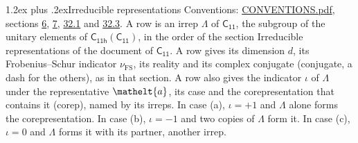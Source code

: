 \documentclass[10pt,a4paper]{article}
\makeatletter
\renewcommand\section{\@startsection{section}{1}{\z@}{-3ex plus -1ex minus -.2ex}%
  {1.2ex plus .2ex}{\normalfont\large\sffamily\bfseries\color{parttitle}}}
\numberwithin{equation}{section}
\newcommand{\eltfont}[1]{{\let\sigma\eltsigma\mathelt{#1}}}
\newcommand{\grp}[1]{\mathsf{#1}}
\newcommand{\elt}[1]{\eltfont{#1}}
\newcommand{\fsind}{\nu_{\mathrm{FS}}}
\makeatother
\begin{document}
\section{Irreducible representations}\label{s:irreps}
Conventions: \href{../../CONVENTIONS.pdf}{CONVENTIONS.pdf}, sections \href{../../../rotation/CONVENTIONS.pdf\#conv.6}{6}, \href{../../../rotation/CONVENTIONS.pdf\#conv.7}{7}, \href{../../CONVENTIONS.pdf\#conv.32.1}{32.1} and \href{../../CONVENTIONS.pdf\#conv.32.3}{32.3}.
\leavevmode\label{n:irrep.Delta}A row is an irrep $\Lambda$ of $\grp{C_{11}}$, the subgroup of the unitary elements of $\grp{C_{11h}}(\grp{C_{11}})$, in the order of the section Irreducible representations of the document of \href{../../../rotation/data/pdf/C11.pdf}{$\grp{C_{11}}$}. \label{n:index.dimension}\label{n:index.frobenius}\label{n:head.irrep}\label{n:head.reality}\label{n:head.conjugate}A row gives its dimension $d$, its Frobenius--Schur indicator $\fsind$, its reality and its complex conjugate (conjugate, a dash for the others), as in that section. \label{n:head.case.corep}\label{n:head.corep}A row also gives the indicator $\iota$ of $\Lambda$ under the representative $\elt{a}$, its case and the corepresentation that contains it (corep), named by its irreps. In case (a), $\iota = +1$ and $\Lambda$ alone forms the corepresentation. In case (b), $\iota = -1$ and two copies of $\Lambda$ form it. In case (c), $\iota = 0$ and $\Lambda$ forms it with its partner, another irrep.
\setlength{\emergencystretch}{2em}\par\setlength{\emergencystretch}{0pt}
\end{document}

